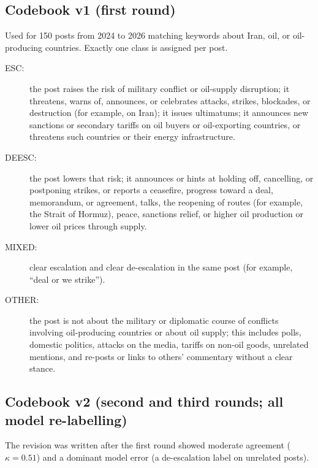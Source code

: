 \documentclass[11pt]{article}
\begin{document}
\subsection{Codebook v1 (first round)}

Used for 150 posts from 2024 to 2026 matching keywords about Iran, oil, or oil-producing countries. Exactly one class is assigned per post.

\begin{description}
\item[ESC:] the post raises the risk of military conflict or oil-supply disruption; it threatens, warns of, announces, or celebrates attacks, strikes, blockades, or destruction (for example, on Iran); it issues ultimatums; it announces new sanctions or secondary tariffs on oil buyers or oil-exporting countries, or threatens such countries or their energy infrastructure.
\item[DEESC:] the post lowers that risk; it announces or hints at holding off, cancelling, or postponing strikes, or reports a ceasefire, progress toward a deal, memorandum, or agreement, talks, the reopening of routes (for example, the Strait of Hormuz), peace, sanctions relief, or higher oil production or lower oil prices through supply.
\item[MIXED:] clear escalation and clear de-escalation in the same post (for example, ``deal or we strike'').
\item[OTHER:] the post is not about the military or diplomatic course of conflicts involving oil-producing countries or about oil supply; this includes polls, domestic politics, attacks on the media, tariffs on non-oil goods, unrelated mentions, and re-posts or links to others' commentary without a clear stance.
\end{description}

\subsection{Codebook v2 (second and third rounds; all model re-labelling)}

The revision was written after the first round showed moderate agreement ($\kappa = 0.51$) and a dominant model error (a de-escalation label on unrelated posts).
\end{document}
